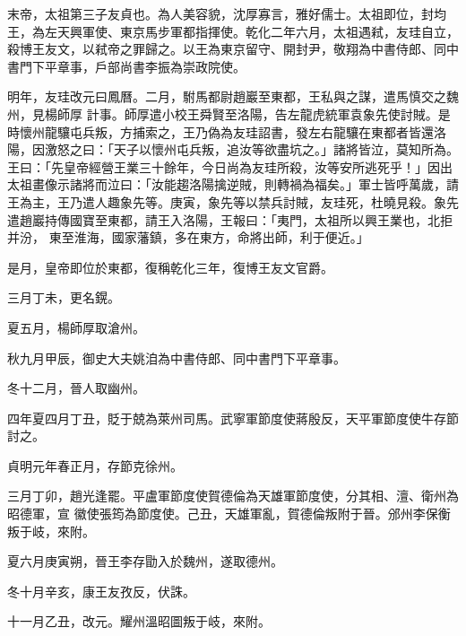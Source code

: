 
\begin{pinyinscope}

 末帝，太祖第三子友貞也。為人美容貌，沈厚寡言，雅好儒士。太祖即位，封均王，為左天興軍使、東京馬步軍都指揮使。乾化二年六月，太祖遇弒，友珪自立，殺博王友文，以弒帝之罪歸之。以王為東京留守、開封尹，敬翔為中書侍郎、同中書門下平章事，戶部尚書李振為崇政院使。



 明年，友珪改元曰鳳曆。二月，駙馬都尉趙巖至東都，王私與之謀，遣馬慎交之魏州，見楊師厚
 計事。師厚遣小校王舜賢至洛陽，告左龍虎統軍袁象先使討賊。是時懷州龍驤屯兵叛，方捕索之，王乃偽為友珪詔書，發左右龍驤在東都者皆還洛陽，因激怒之曰：「天子以懷州屯兵叛，追汝等欲盡坑之。」諸將皆泣，莫知所為。王曰：「先皇帝經營王業三十餘年，今日尚為友珪所殺，汝等安所逃死乎！」因出太祖畫像示諸將而泣曰：「汝能趨洛陽擒逆賊，則轉禍為福矣。」軍士皆呼萬歲，請王為主，王乃遣人趣象先等。庚寅，象先等以禁兵討賊，友珪死，杜曉見殺。象先遣趙巖持傳國寶至東都，請王入洛陽，王報曰：「夷門，太祖所以興王業也，北拒并汾，
 東至淮海，國家藩鎮，多在東方，命將出師，利于便近。」



 是月，皇帝即位於東都，復稱乾化三年，復博王友文官爵。



 三月丁未，更名鎤。



 夏五月，楊師厚取滄州。



 秋九月甲辰，御史大夫姚洎為中書侍郎、同中書門下平章事。



 冬十二月，晉人取幽州。



 四年夏四月丁丑，貶于兢為萊州司馬。武寧軍節度使蔣殷反，天平軍節度使牛存節討之。



 貞明元年春正月，存節克徐州。



 三月丁卯，趙光逢罷。平盧軍節度使賀德倫為天雄軍節度使，分其相、澶、衛州為昭德軍，宣
 徽使張筠為節度使。己丑，天雄軍亂，賀德倫叛附于晉。邠州李保衡叛于岐，來附。



 夏六月庚寅朔，晉王李存勖入於魏州，遂取德州。



 冬十月辛亥，康王友孜反，伏誅。



 十一月乙丑，改元。耀州溫昭圖叛于岐，來附。




\end{pinyinscope}
